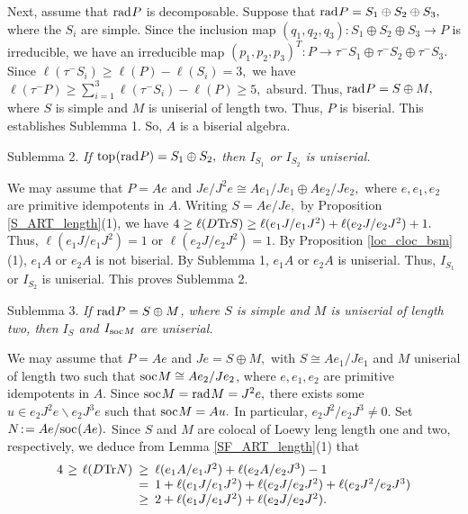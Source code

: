 \documentclass[10pt]{amsart}
\theoremstyle{definition}
\newcommand{\rad}{{\rm rad}\hspace{.5pt}}
\newcommand{\soc}{{\rm soc}\hspace{.5pt}}
\newcommand{\ntop}{{\rm top}\hspace{.5pt}}
\newcommand{\hp}{\hspace{.5pt}}
\newcommand{\vp}{\vspace{.5pt}}
\begin{document}
Next, assume that $\rad P$ is decomposable. Suppose that $\rad P=S_1 \oplus S_2 \oplus S_3,$ where the $S_i$ are simple. \vp Since the inclusion map $(q_1, q_2, q_3): S_1\oplus S_2 \oplus S_3 \to P$ is irreducible, \vspace{1pt} we have an irreducible map $(p_1, p_2, p_3)^T: P\to \tau^-S_1\oplus \tau^-S_2 \oplus \tau^-S_3.$ Since $\ell(\tau^-S_i)\ge \ell(P)-\ell(S_i)= 3,$ we have $\ell(\tau^-P) \ge \sum_{i=1}^3 \ell(\tau^-S_i)-\ell(P) \ge 5,$ absurd. Thus, $\rad P=S\oplus M,$ where $S$ is simple and $M$ is uniserial of length two. Thus, $P$ is biserial. This establishes Sublemma 1. So, $A$ is a biserial algebra.

\vp\vp

{\sc Sublemma 2.} {\it If $\ntop(\rad P)=S_1 \oplus S_2,$ then $I_{S_1}$ or $I_{S_2}$ is uniserial. }

We may assume that $P=Ae$ and $Je/J^2e \cong Ae_1/Je_1\oplus Ae_2/Je_2,$ where \vspace{.5pt} $e, e_1, e_2$ are primitive idempotents in $A$. Writing $S=Ae/Je,$ by Proposition \ref{S_ART_length}(1), we have $4\ge \ell(D{\rm Tr} S)\ge \ell(e_1J/e_1J^2)+ \ell(e_2J/e_2J^2)+1.$ Thus, $\ell(e_1J/e_1J^2)=1$ or $\ell(e_2J/e_2J^2)=1.$ By Proposition \ref{loc_cloc_bsm}(1), $e_1A$ or $e_2A$ is not biserial. By Sublemma 1, $e_1A$ or $e_2A$ is uniserial. Thus,
$I_{S_1}$ or $I_{S_2}$ is uniserial. This proves Sublemma 2.

\vp \vp

{\sc Sublemma 3.} {\it If $\rad P=S\oplus M$, where $S$ is simple and $M$ is uniserial of length two, then $I_S$ and $I_{\soc M}$ are uniserial.}

We may assume that $P=Ae$ and $Je=S\oplus M,$ with $S\cong Ae_1/Je_1$ and $M$ uniserial of length two such that $\soc M\cong Ae_2/Je_2$, where $e, e_1, e_2$ are primitive idempotents in $A$. Since $\soc M=\rad M=J^2e,$ there exists some $u\in e_2J^2e\backslash e_2J^3e$ such that $\soc M=Au.$ In particular, $e_2J^2/e_2J^3\ne 0.$
Set $N\!:\hp\hp =Ae/\soc(Ae).$ Since $S$ and $M$ are colocal of Loewy leng length one and two, respectively, we deduce from Lemma \ref{SF_ART_length}(1) that \vspace{-1pt}
$$
\begin{array}{rcl}
4 \hspace{1pt} \ge \hspace{1pt} \ell(D{\rm Tr} N) \hspace{-5pt} & \ge  & \hspace{-5pt}\ell(e_1A/e_1J^2)+\ell(e_2A/e_2J^3) -1 \\
&=& \hspace{-5pt} 1+ \ell(e_1J/e_1J^2) + \ell(e_2J/e_2J^2) + \ell(e_2J^2/e_2J^3) \\ 
&\ge & \hspace{-5pt} 2+\ell(e_1J/e_1J^2)+\ell(e_2J/e_2J^2).\vspace{-3pt}
\end{array}$$ 
\end{document}
